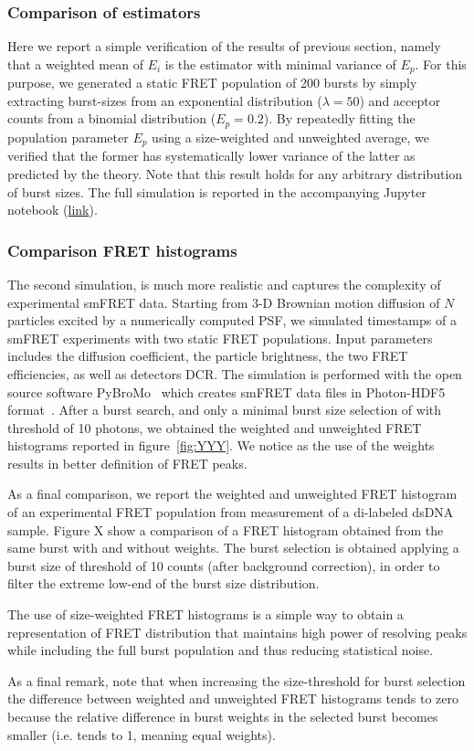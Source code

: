 \subsubsection{Comparison of estimators}
Here we report a simple verification of the results of previous section, namely
that a weighted mean of $E_i$ is the estimator with minimal variance of $E_p$.
For this purpose, we generated a static FRET population of 200 bursts 
by simply extracting burst-sizes from an exponential distribution ($\lambda = 50$)
and acceptor counts from a binomial distribution ($E_p = 0.2$). 
By repeatedly fitting the population parameter $E_p$ using a 
size-weighted and unweighted average, we verified that the former has systematically
lower variance of the latter as predicted by the theory. Note that this result
holds for any arbitrary distribution of burst sizes. The full simulation is reported in
the accompanying Jupyter notebook (\href{}{link}).

\subsubsection{Comparison FRET histograms}
The second simulation, is much more realistic and captures the complexity of 
experimental smFRET data. Starting from 3-D Brownian motion 
diffusion of $N$ particles excited by a numerically computed PSF, we simulated timestamps
of a smFRET experiments with two static FRET populations. Input parameters includes
the diffusion coefficient, the particle brightness, the two FRET efficiencies,
as well as detectors DCR. The simulation is performed with the open source software 
PyBroMo~\cite{Ingargiola_2016} which creates smFRET data files in Photon-HDF5 
format~\cite{Ingargiola2016}.
After a burst search, and only a minimal burst size selection of with threshold of 10 photons,
we obtained the weighted and unweighted FRET histograms reported in figure~\ref{fig:YYY}.
We notice as the use of the weights results in better definition of FRET peaks.

As a final comparison, we report the weighted and unweighted FRET histogram of 
an experimental FRET population from measurement of a di-labeled dsDNA sample.
Figure X show a comparison of a FRET histogram obtained from the same burst
with and without weights. The burst selection is obtained applying a burst size
of threshold of 10 counts (after background correction), in order to filter 
the extreme low-end of the burst size distribution.

The use of size-weighted FRET histograms is a simple way to obtain a representation of FRET 
distribution that maintains high power of resolving peaks while including the full burst
population and thus reducing statistical noise.

As a final remark, note that when increasing the size-threshold for burst selection
the difference between weighted and unweighted FRET histograms tends to zero because
the relative difference in burst weights in the selected burst becomes smaller 
(i.e. tends to 1, meaning equal weights).